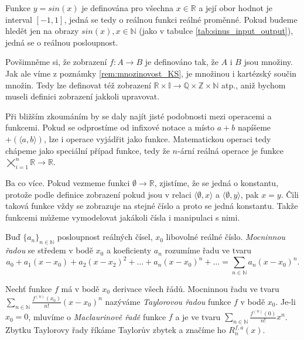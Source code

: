 \begin{example}
Funkce $y=sin(x)$ je definována pro všechna $x\in\mathbb{R}$ a její obor hodnot je interval $[-1,1]$, jedná se tedy o reálnou funkci reálné proměnné. Pokud budeme hledět jen na obrazy $sin(x), x\in\mathbb{N}$ (jako v tabulce \ref{tab:sinus_input_output}), jedná se o reálnou posloupnost.
\end{example}

Povšimněme si, že zobrazení $f:A\rightarrow B$ je definováno tak, že $A$ i $B$ jsou množiny. Jak ale víme z poznámky \ref{rem:mnozinovost_KS}, je množinou i kartézský součin množin. Tedy lze definovat též zobrazení $\mathbb{R}\times\mathbb{I}\rightarrow\mathbb{Q}\times\mathbb{Z}\times\mathbb{N}$ atp., aniž bychom museli definici zobrazení jakkoli upravovat.

Při bližším zkoumáním by se daly najít jisté podobnosti mezi operacemi a funkcemi. Pokud se odprostíme od infixové notace a místo $a + b$ napíšeme $+(\langle a, b\rangle)$, lze i operace vyjádřit jako funkce. Matematickou operaci tedy chápeme jako speciální případ funkce, tedy že $n$-ární reálná operace je funkce $\bigtimes_{i=1}^{n}\mathbb{R}\rightarrow \mathbb{R}$.

Ba co více. Pokud vezmeme funkci $\emptyset \rightarrow \mathbb{R}$, zjistíme, že se jedná o konstantu, protože podle definice zobrazení pokud jsou v relaci $\langle \emptyset, x\rangle$ a $\langle \emptyset, y\rangle$, pak $x = y$. Čili taková funkce vždy se zobrazuje na stejné číslo a proto se jedná konstantu. Takže funkcemi můžeme vymodelovat jakákoli čísla i manipulaci s nimi.

\begin{definition}
Buď $\{a_n\}_{n\in\mathbb{N}}$ posloupnost reálných čísel, $x_0$ libovolné reálné číslo. \textit{Mocninnou řadou} se středem v bodě $x_0$ a koeficienty $a_n$ rozumíme řadu ve tvaru
\begin{equation}
a_0+a_1(x-x_0)+a_2(x-x_2)^2+\ldots+a_n(x-x_0)^n+\ldots=\sum_{n\in\mathbb{N}}a_n(x-x_0)^n.
\end{equation}
\end{definition}

\begin{definition}\label{def:taymac_rada}
Nechť funkce $f$ má v bodě $x_0$ derivace všech řádů. Mocninnou řadu ve tvaru $\sum_{n\in\mathbb{N}}\frac{f^{(n)}(x_0)}{n!}(x-x_0)^n$ nazýváme \textit{Taylorovou řadou} funkce $f$ v bodě $x_0$. Je-li $x_0=0$, mluvíme o \textit{Maclaurinově řadě} funkce $f$ a je ve tvaru $\sum_{n\in\mathbb{N}}\frac{f^{(n)}(0)}{n!}x^n$. Zbytku Taylorovy řady říkáme Taylorův zbytek a značíme ho $R^{f,a}_n(x)$.
\end{definition}

